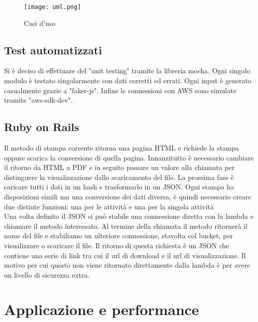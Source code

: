 \documentclass[12pt]{article}
\begin{document}
\begin{figure}[H]
\texttt{[image: uml.png]}
\centering
\caption{Casi d'uso}
\end{figure}

\subsection{Test automatizzati}
Si è deciso di effettuare del "unit testing" tramite la libreria mocha.
Ogni singolo modulo è testato singolarmente con dati corretti ed errati. 
Ogni input è generato casualmente grazie a "faker-js". 
Infine le connessioni con AWS sono simulate tramite "aws-sdk-dev". 

\subsection{Ruby on Rails}
Il metodo di stampa corrente ritorna una pagina HTML e richiede la stampa oppure 
scarica la conversione di quella pagina. Innanzitutto è necessario cambiare il 
ritorno da HTML a PDF e in seguito passare un valore alla chiamata per distinguere 
la visualizzazione dallo scaricamento del file. 
La prossima fase è caricare tutti i dati in un hash e trasformarlo in un JSON. 
Ogni stampa ha disposizioni simili ma una conversione dei dati diversa, è quindi 
necessario creare due distinte funzioni: una per le attività e una per la singola 
attività
\\ Una volta definito il JSON si può stabile una connessione diretta con la lambda e 
chiamare il metodo interessato.
Al termine della chiamata il metodo ritornerà il nome del file e stabiliamo un
ulteriore connessione, stavolta col bucket, per visualizzare o scaricare il file.
Il ritorno di questa richiesta è un JSON che
contiene una serie di link tra cui il url di download e il url di visualizzazione.
Il motivo per cui questo non viene ritornato direttamente dalla lambda è per avere 
un livello di sicurezza extra. 

\section{Applicazione e performance}
\end{document}
